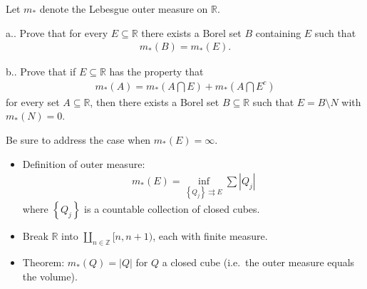 Let \(m_*\) denote the Lebesgue outer measure on \({\mathbb{R}}\).

a.. Prove that for every \(E\subseteq {\mathbb{R}}\) there exists a
Borel set \(B\) containing \(E\) such that
\begin{align*}
m_*(B) = m_*(E)
.\end{align*}

b.. Prove that if \(E\subseteq {\mathbb{R}}\) has the property that
\begin{align*}
m_*(A) = m_*(A\displaystyle\bigcap E) + m_*(A\displaystyle\bigcap E^c)
\end{align*}
for every set \(A\subseteq {\mathbb{R}}\), then there exists a Borel set
\(B\subseteq {\mathbb{R}}\) such that \(E = B\setminus N\) with
\(m_*(N) = 0\).

Be sure to address the case when \(m_*(E) = \infty\).

\begin{concept}

\envlist

\begin{itemize}
\tightlist
\item
  Definition of outer measure:
  \begin{align*} 
  m_*(E) = \inf_{\left\{{Q_j}\right\} \rightrightarrows E} \sum {\left\lvert {Q_j} \right\rvert}
  \end{align*}
  where \(\left\{{Q_j}\right\}\) is a countable collection of closed
  cubes.
\item
  Break \({\mathbb{R}}\) into
  \({\textstyle\coprod}_{n\in {\mathbb{Z}}} [n, n+1)\), each with finite
  measure.
\item
  Theorem: \(m_*(Q) = {\left\lvert {Q} \right\rvert}\) for \(Q\) a
  closed cube (i.e.~the outer measure equals the volume).
\end{itemize}

\end{concept}

